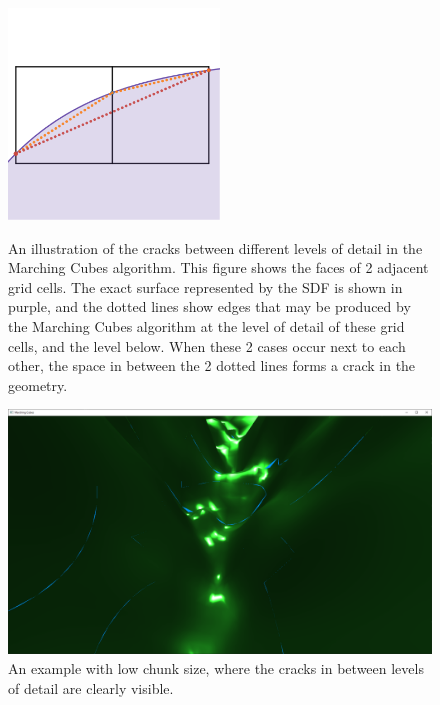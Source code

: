 \documentclass{article}
\begin{document}
\begin{figure}
  \caption{An illustration of the cracks between different levels of detail in the Marching Cubes algorithm. This figure shows the faces of 2 adjacent grid cells. The exact surface represented by the SDF is shown in purple, and the dotted lines show edges that may be produced by the Marching Cubes algorithm at the level of detail of these grid cells, and the level below. When these 2 cases occur next to each other, the space in between the 2 dotted lines forms a crack in the geometry.}
  \includegraphics[width=0.5\textwidth]{cracks_demo.png}
  \label{fig:cracks_demo}
\end{figure}

\begin{figure}[H]
  \includegraphics[width=\textwidth]{cracks2.png}
  \caption{An example with low chunk size, where the cracks in between levels of detail are clearly visible.}
  \label{fig:cracks2}
\end{figure}
\end{document}
